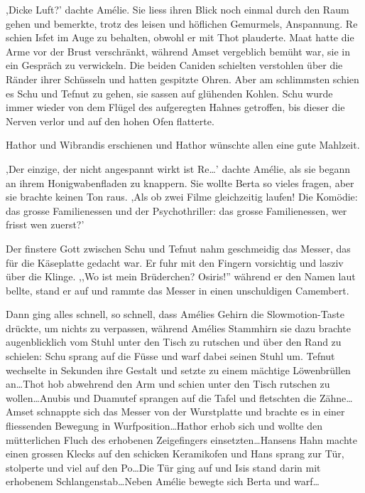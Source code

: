 \documentclass[11pt,titlepage,a5paper]{book}
\begin{document}
,Dicke Luft?' dachte Amélie. Sie liess ihren Blick noch einmal durch den Raum gehen und bemerkte, trotz des leisen und höflichen Gemurmels, Anspannung. Re schien Isfet im Auge zu behalten, obwohl er mit Thot plauderte. Maat hatte die Arme vor der Brust verschränkt, während Amset vergeblich bemüht war, sie in ein Gespräch zu verwickeln. Die beiden Caniden schielten verstohlen über die Ränder ihrer Schüsseln und hatten gespitzte Ohren. Aber am schlimmsten schien es Schu und Tefnut zu gehen, sie sassen auf glühenden Kohlen. Schu wurde immer wieder von dem Flügel des aufgeregten Hahnes getroffen, bis dieser die Nerven verlor und auf den hohen Ofen flatterte.

Hathor und Wibrandis erschienen und Hathor wünschte allen eine gute Mahlzeit. 

,Der einzige, der nicht angespannt wirkt ist Re\dots' dachte Amélie, als sie begann an ihrem Honigwabenfladen zu knappern. Sie wollte Berta so vieles fragen, aber sie brachte keinen Ton raus. ,Als ob zwei Filme gleichzeitig laufen! Die Komödie: das grosse Familienessen und der Psychothriller: das grosse Familienessen, wer frisst wen zuerst?'

Der finstere Gott zwischen Schu und Tefnut nahm geschmeidig das Messer, das für die Käseplatte gedacht war. Er fuhr mit den Fingern vorsichtig und lasziv über die Klinge. ,,Wo ist mein Brüderchen? Osiris!'' während er den Namen laut bellte, stand er auf und rammte das Messer in einen unschuldigen Camembert.

Dann ging alles schnell, so schnell, dass Amélies Gehirn die Slowmotion-Taste drückte, um nichts zu verpassen, während Amélies Stammhirn sie dazu brachte augenblicklich vom Stuhl unter den Tisch zu rutschen und über den Rand zu schielen: Schu sprang auf die Füsse und warf dabei seinen Stuhl um. Tefnut wechselte in Sekunden ihre Gestalt und setzte zu einem mächtige Löwenbrüllen an\dots Thot hob abwehrend den Arm und schien unter den Tisch rutschen zu wollen\dots Anubis und Duamutef sprangen auf die Tafel und fletschten die Zähne\dots Amset schnappte sich das Messer von der Wurstplatte und brachte es in einer fliessenden Bewegung in Wurfposition\dots Hathor erhob sich und wollte den mütterlichen Fluch des erhobenen Zeigefingers einsetzten\dots Hansens Hahn machte einen grossen Klecks auf den schicken Keramikofen und Hans sprang zur Tür, stolperte und viel auf den Po\dots Die Tür ging auf und Isis stand darin mit erhobenem Schlangenstab\dots Neben Amélie bewegte sich Berta und warf\dots
\end{document}
